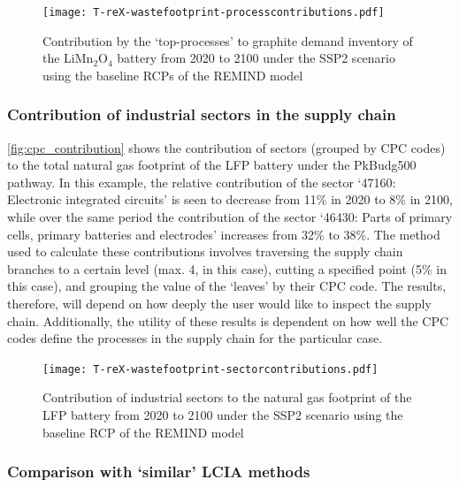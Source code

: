 \documentclass[a4paper,fleqn]{cas-dc}
\begin{document}
	\begin{figure}[!htbp]
		\centering
		\texttt{[image: T-reX-wastefootprint-processcontributions.pdf]}
		\caption{Contribution by the `top-processes' to graphite demand inventory of the LiMn\(_2\)O\(_4\) battery from 2020 to 2100 under the SSP2 scenario using the baseline RCPs of the REMIND model}\label{fig:top_contribution}
	\end{figure} 
	
	
	
	\subsubsection{Contribution of industrial sectors in the supply chain}\label{sec:results-case_study-topsectors}
	
	\autoref{fig:cpc_contribution} shows the contribution of sectors (grouped by CPC codes) to the total natural gas footprint of the LFP battery under the PkBudg500 pathway. In this example, the relative contribution of the sector `47160: Electronic integrated circuits' is seen to decrease from 11\% in 2020 to 8\% in 2100, while over the same period the contribution of the sector `46430: Parts of primary cells, primary batteries and electrodes' increases from 32\% to 38\%. The method used to calculate these contributions involves traversing the supply chain branches to a certain level (max. 4, in this case), cutting a specified point (5\% in this case), and grouping the value of the `leaves' by their CPC code. The results, therefore, will depend on how deeply the user would like to inspect the supply chain. Additionally, the utility of these results is dependent on how well the CPC codes define the processes in the supply chain for the particular case.
	
	\begin{figure}
		\centering
		\texttt{[image: T-reX-wastefootprint-sectorcontributions.pdf]}
		\caption{Contribution of industrial sectors to the natural gas footprint of the LFP battery from 2020 to 2100 under the SSP2 scenario using the baseline RCP of the REMIND model}\label{fig:cpc_contribution}
	\end{figure} 
	
	
	\subsubsection{Comparison with `similar' LCIA methods}\label{sec:results-case_study-methodcomparison}
	
\end{document}
